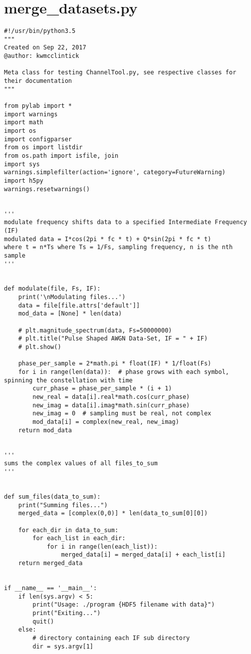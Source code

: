 \section{merge\_datasets.py}
\begin{lstlisting}[breaklines]
#!/usr/bin/python3.5
"""
Created on Sep 22, 2017
@author: kwmcclintick

Meta class for testing ChannelTool.py, see respective classes for their documentation
"""

from pylab import *
import warnings
import math
import os
import configparser
from os import listdir
from os.path import isfile, join
import sys
warnings.simplefilter(action='ignore', category=FutureWarning)
import h5py
warnings.resetwarnings()


'''
modulate frequency shifts data to a specified Intermediate Frequency (IF)
modulated data = I*cos(2pi * fc * t) + Q*sin(2pi * fc * t)
where t = n*Ts where Ts = 1/Fs, sampling frequency, n is the nth sample
'''


def modulate(file, Fs, IF):
    print('\nModulating files...')
    data = file[file.attrs['default']]
    mod_data = [None] * len(data)

    # plt.magnitude_spectrum(data, Fs=50000000)
    # plt.title("Pulse Shaped AWGN Data-Set, IF = " + IF)
    # plt.show()

    phase_per_sample = 2*math.pi * float(IF) * 1/float(Fs)
    for i in range(len(data)):  # phase grows with each symbol, spinning the constellation with time
        curr_phase = phase_per_sample * (i + 1)
        new_real = data[i].real*math.cos(curr_phase)
        new_imag = data[i].imag*math.sin(curr_phase)
        new_imag = 0  # sampling must be real, not complex
        mod_data[i] = complex(new_real, new_imag)
    return mod_data


'''
sums the complex values of all files_to_sum
'''


def sum_files(data_to_sum):
    print("Summing files...")
    merged_data = [complex(0,0)] * len(data_to_sum[0][0])

    for each_dir in data_to_sum:
        for each_list in each_dir:
            for i in range(len(each_list)):
                merged_data[i] = merged_data[i] + each_list[i]
    return merged_data


if __name__ == '__main__':
    if len(sys.argv) < 5:
        print("Usage: ./program {HDF5 filename with data}")
        print("Exiting...")
        quit()
    else:
        # directory containing each IF sub directory
        dir = sys.argv[1]


\end{lstlisting}
